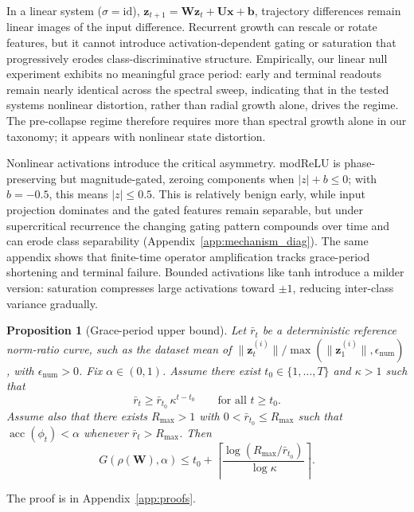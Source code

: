 \documentclass{article}
\newtheorem{proposition}[theorem]{Proposition}
\theoremstyle{remark}
\newcommand{\bz}{\mathbf{z}}
\newcommand{\bx}{\mathbf{x}}
\newcommand{\bW}{\mathbf{W}}
\newcommand{\bU}{\mathbf{U}}
\newcommand{\sr}{\rho(\bW)}
\begin{document}
In a linear system ($\sigma = \text{id}$),
$\bz_{t+1} = \bW \bz_t + \bU \bx + \mathbf{b}$, trajectory differences remain
linear images of the input difference. Recurrent growth can rescale or rotate
features, but it cannot introduce activation-dependent gating or saturation
that progressively erodes class-discriminative structure. Empirically, our
linear null experiment exhibits no meaningful grace period: early and terminal
readouts remain nearly identical across the spectral sweep, indicating that in
the tested systems nonlinear distortion, rather than radial growth alone,
drives the regime. The pre-collapse regime therefore requires more than
spectral growth alone in our taxonomy; it appears with nonlinear state
distortion.

Nonlinear activations introduce the critical asymmetry. modReLU is
phase-preserving but magnitude-gated, zeroing components when $|z| + b \leq 0$;
with $b=-0.5$, this means $|z|\leq0.5$. This is relatively benign early, while
input projection dominates and the gated features remain separable, but under
supercritical recurrence the changing gating pattern compounds over time and
can erode class separability (Appendix~\ref{app:mechanism_diag}). The same
appendix shows that finite-time
operator amplification tracks grace-period shortening and terminal failure.
Bounded activations like tanh introduce a milder version: saturation compresses
large activations toward $\pm1$, reducing inter-class variance gradually.


\begin{proposition}[Grace-period upper bound]
\label{prop:grace}
Let $\bar r_t$ be a deterministic reference norm-ratio curve, such as the
dataset mean of
$\|\bz_t^{(i)}\|/\max(\|\bz_1^{(i)}\|,\epsilon_{\mathrm{num}})$, with
$\epsilon_{\mathrm{num}}>0$. Fix $\alpha \in (0,1)$.
Assume there exist $t_0 \in \{1,\ldots,T\}$ and $\kappa > 1$ such that
\[
  \bar r_t \geq \bar r_{t_0}\,\kappa^{t-t_0}
  \qquad \text{for all } t \geq t_0.
\]
Assume also that there exists $R_{\max} > 1$ with
$0<\bar r_{t_0}\leq R_{\max}$ such that
$\operatorname{acc}(\phi_t) < \alpha$ whenever $\bar r_t > R_{\max}$.
Then
\begin{equation}
    G(\sr,\alpha) \leq t_0 + \left\lceil
    \frac{\log(R_{\max} / \bar r_{t_0})}{\log \kappa}
    \right\rceil.
    \label{eq:grace_bound}
\end{equation}
\end{proposition}

The proof is in Appendix~\ref{app:proofs}.
\end{document}
